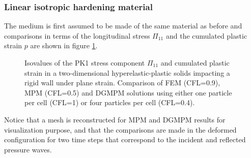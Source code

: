 \subsubsection{Linear isotropic hardening material}
\label{sec:line-isotr-hard}

The medium is first assumed to be made of the same material as before and comparisons in terms of the longitudinal stress $\Pi_{11}$ and the cumulated plastic strain $p$ are shown in figure \ref{fig:PS_taylor}.
\begin{figure}[h!]
  \centering
  \qquad
  \caption{Isovalues of the PK1 stress component $\Pi_{11}$ and cumulated plastic strain in a two-dimensional hyperelastic-plastic solids impacting a rigid wall under plane strain. Comparison of FEM (CFL=0.9), MPM (CFL=0.5) and DGMPM solutions using either one particle per cell (CFL=1) or four particles per cell (CFL=0.4).}
  \label{fig:PS_taylor}
\end{figure}
Notice that a mesh is reconstructed for MPM and DGMPM results for visualization purpose, and that the comparisons are made in the deformed configuration for two time steps that correspond to the incident and reflected pressure waves.

